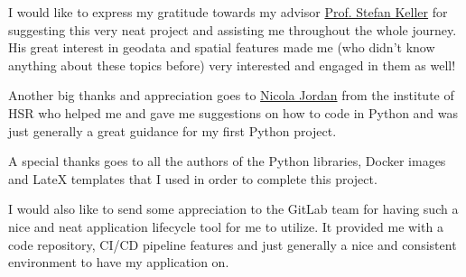 I would like to express my gratitude towards my advisor \href{mailto:stefan.keller@hsr.ch}{Prof. Stefan Keller} for suggesting this very neat project and assisting me throughout the whole journey. His great interest in geodata and spatial features made me (who didn't know anything about these topics before) very interested and engaged in them as well!

Another big thanks and appreciation goes to \href{mailto:nicola.jordan@hsr.ch}{Nicola Jordan} from the institute of HSR who helped me and gave me suggestions on how to code in Python and was just generally a great guidance for my first Python project.


A special thanks goes to all the authors of the Python libraries, Docker images and LateX templates that I used in order to complete this project.

I would also like to send some appreciation to the GitLab team for having such a nice and neat application lifecycle tool for me to utilize. It provided me with a code repository, CI/CD pipeline features and just generally a nice and consistent environment to have my application on.